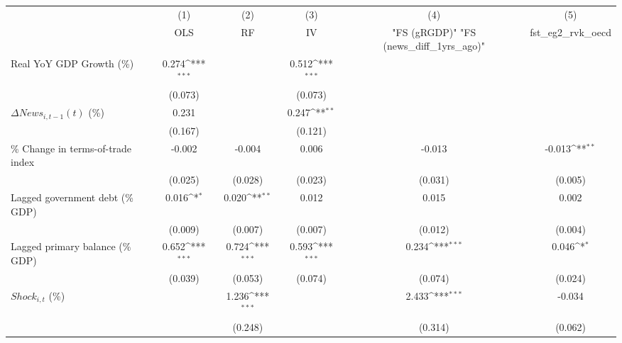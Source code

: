 {
\def\sym#1{\ifmmode^{#1}\else\(^{#1}\)\fi}
\begin{tabular}{l*{5}{c}}
\toprule
                    &\multicolumn{1}{c}{(1)}&\multicolumn{1}{c}{(2)}&\multicolumn{1}{c}{(3)}&\multicolumn{1}{c}{(4)}&\multicolumn{1}{c}{(5)}\\
                    &\multicolumn{1}{c}{OLS}&\multicolumn{1}{c}{RF}&\multicolumn{1}{c}{IV}&\multicolumn{1}{c}{ "FS (gRGDP)"  "FS (news_diff_1yrs_ago)" }&\multicolumn{1}{c}{fst_eg2_rvk_oecd}\\
\midrule
Real YoY GDP Growth (\%)&       0.274\sym{***}&                     &       0.512\sym{***}&                     &                     \\
                    &     (0.073)         &                     &     (0.073)         &                     &                     \\
\addlinespace
$ \Delta News_{i,t-1}(t)$ (\%)&       0.231         &                     &       0.247\sym{**} &                     &                     \\
                    &     (0.167)         &                     &     (0.121)         &                     &                     \\
\addlinespace
\% Change in terms-of-trade index&      -0.002         &      -0.004         &       0.006         &      -0.013         &      -0.013\sym{**} \\
                    &     (0.025)         &     (0.028)         &     (0.023)         &     (0.031)         &     (0.005)         \\
\addlinespace
Lagged government debt (\% GDP)&       0.016\sym{*}  &       0.020\sym{**} &       0.012         &       0.015         &       0.002         \\
                    &     (0.009)         &     (0.007)         &     (0.007)         &     (0.012)         &     (0.004)         \\
\addlinespace
Lagged primary balance (\% GDP)&       0.652\sym{***}&       0.724\sym{***}&       0.593\sym{***}&       0.234\sym{***}&       0.046\sym{*}  \\
                    &     (0.039)         &     (0.053)         &     (0.074)         &     (0.074)         &     (0.024)         \\
\addlinespace
$ Shock_{i,t}$ (\%) &                     &       1.236\sym{***}&                     &       2.433\sym{***}&      -0.034         \\
                    &                     &     (0.248)         &                     &     (0.314)         &     (0.062)         \\

\end{tabular}}
